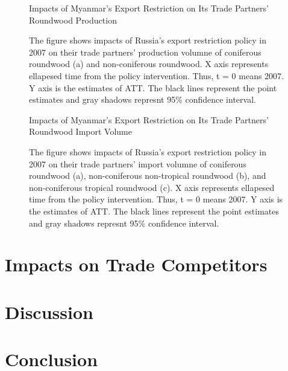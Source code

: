 \documentclass[a4paper,12pt]{article}
\begin{document}
\begin{figure}[H] 
    \centering
    \caption{Impacts of Myanmar's Export Restriction on Its Trade Partners' Roundwood Production}
    \caption*{\small{The figure shows impacts of Russia's export restriction policy in 2007 on their trade partners' production volumne of coniferous roundwood (a) and non-coniferous roundwood. X axis represents ellapesed time from the policy intervention. Thus, t = 0 means 2007. Y axis is the estimates of ATT. The black lines represent the point estimates and gray shadows represnt 95\% confidence interval.}}
    \label{fig:cf_prod_Myanmar}
\end{figure}

\begin{figure}[H] 
    \centering
    \caption{Impacts of Myanmar's Export Restriction on Its Trade Partners' Roundwood Import Volume}
    \caption*{\small{The figure shows impacts of Russia's export restriction policy in 2007 on their trade partners' import volumne of coniferous roundwood (a), non-coniferous non-tropical roundwood (b), and non-coniferous tropical roundwood (c). X axis represents ellapesed time from the policy intervention. Thus, t = 0 means 2007. Y axis is the estimates of ATT. The black lines represent the point estimates and gray shadows represnt 95\% confidence interval.}}
    \label{fig:cf_imp_Myanmar}
\end{figure}

\section{Impacts on Trade Competitors}

\section{Discussion}

\section{Conclusion}


\end{document}
